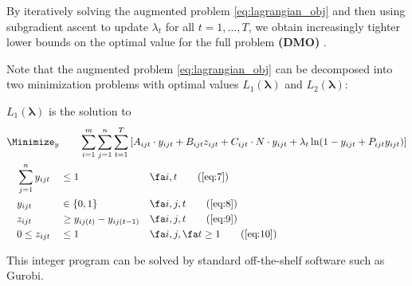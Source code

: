 \documentclass{article}
\newcommand{\model}{{\bf (DMO) }}
\begin{document}
By iteratively solving the augmented problem \eqref{eq:lagrangian_obj} and then using subgradient ascent to update $\lambda_t$ for all $t=1,\ldots,T$, we obtain increasingly tighter lower bounds on the optimal value for the full problem \model.


Note that the augmented problem \eqref{eq:lagrangian_obj} can be decomposed into two minimization problems with optimal values $L_1(\bm{\lambda})$ and $L_2(\bm{\lambda})$:\\
\begin{minipage}{\linewidth}
{
    $L_1(\bm{\lambda})$ is the solution to\\
    \small
    \begin{alignat}{4}
        &\Minimize_{y}\qquad \span\span\span\span\span\span \sum_{i=1}^{m}\sum_{j=1}^{n}\sum_{t=1}^{T} \left[A_{ijt}\cdot y_{ijt} + B_{ijt}z_{ijt} + C_{ijt}\cdot N \cdot y_{ijt}  + \lambda_t \ln (1-y_{ijt} + P_{ijt} y_{ijt}) \right]\nonumber\\
         & {} && \sum_{j=1}^{n}y_{ijt}  &&\le 1 && \fa i,t \tag{\ref{eq:7}}\\
         & {} && y_{ijt} &&\in \{0,1\} && \fa i,j,t \tag{\ref{eq:8}}\\
         & {} && z_{ijt} &&\ge y_{ij(t)}-y_{ij(t-1)}  && \fa i,j, t \tag{\ref{eq:9}}\\
         & {} && 0 \le z_{ijt} &&\le 1 && \fa i,j, \fa t\ge 1 \tag{\ref{eq:10}}
    \end{alignat}
}

This integer program can be solved by standard off-the-shelf software such as Gurobi.

\end{minipage}\\
\end{document}
